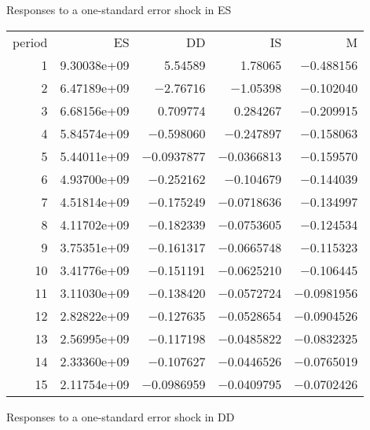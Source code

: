 \documentclass[11pt]{article}
\begin{document}
\thispagestyle{empty}

\vspace{1em}

Responses to a one-standard error shock in ES

\vspace{1em}

\begin{longtable}{rrrrr}
period &  ES &  DD &  IS &  M \\
1 & 9.30038\textrm{e+09} & 5.54589 & 1.78065 & $-$0.488156\\
2 & 6.47189\textrm{e+09} & $-$2.76716 & $-$1.05398 & $-$0.102040\\
3 & 6.68156\textrm{e+09} & 0.709774 & 0.284267 & $-$0.209915\\
4 & 5.84574\textrm{e+09} & $-$0.598060 & $-$0.247897 & $-$0.158063\\
5 & 5.44011\textrm{e+09} & $-$0.0937877 & $-$0.0366813 & $-$0.159570\\
6 & 4.93700\textrm{e+09} & $-$0.252162 & $-$0.104679 & $-$0.144039\\
7 & 4.51814\textrm{e+09} & $-$0.175249 & $-$0.0718636 & $-$0.134997\\
8 & 4.11702\textrm{e+09} & $-$0.182339 & $-$0.0753605 & $-$0.124534\\
9 & 3.75351\textrm{e+09} & $-$0.161317 & $-$0.0665748 & $-$0.115323\\
10 & 3.41776\textrm{e+09} & $-$0.151191 & $-$0.0625210 & $-$0.106445\\
11 & 3.11030\textrm{e+09} & $-$0.138420 & $-$0.0572724 & $-$0.0981956\\
12 & 2.82822\textrm{e+09} & $-$0.127635 & $-$0.0528654 & $-$0.0904526\\
13 & 2.56995\textrm{e+09} & $-$0.117198 & $-$0.0485822 & $-$0.0832325\\
14 & 2.33360\textrm{e+09} & $-$0.107627 & $-$0.0446526 & $-$0.0765019\\
15 & 2.11754\textrm{e+09} & $-$0.0986959 & $-$0.0409795 & $-$0.0702426\\
\end{longtable}

\vspace{1em}

Responses to a one-standard error shock in DD

\vspace{1em}
\end{document}
